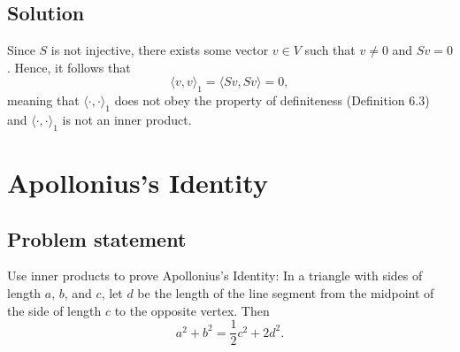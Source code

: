 \documentclass{article}
\begin{document}
\subsection*{Solution}
Since $S$ is not injective, there exists some vector $v\in V$ such that $v\neq0$ and $Sv=0$. 
Hence, it follows that
\[\langle v,v\rangle_1=\langle Sv,Sv\rangle=0,\]
meaning that $\langle\cdot,\cdot\rangle_1$ does not obey the property of definiteness (Definition 6.3) and $\langle\cdot,\cdot\rangle_1$ is not an inner product.

\clearpage

\renewcommand{\thesection}{31}
\section{Apollonius's Identity}
\subsection*{Problem statement}
Use inner products to prove Apollonius's Identity: In a triangle with sides of length $a$, $b$, and $c$, let $d$ be the length of the line segment from the midpoint of the side of length $c$ to the opposite vertex. 
Then
\[a^2+b^2=\frac{1}{2}c^2+2d^2.\]
\end{document}
